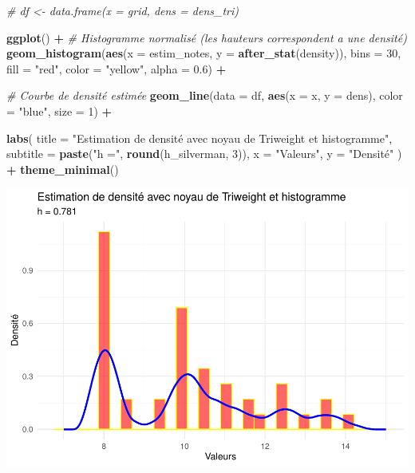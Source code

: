 \documentclass[
  12pt,
]{article}
\newenvironment{Shaded}{\begin{snugshade}}{\end{snugshade}}
\newcommand{\AttributeTok}[1]{\textcolor[rgb]{0.13,0.29,0.53}{#1}}
\newcommand{\CommentTok}[1]{\textcolor[rgb]{0.56,0.35,0.01}{\textit{#1}}}
\newcommand{\DecValTok}[1]{\textcolor[rgb]{0.00,0.00,0.81}{#1}}
\newcommand{\FloatTok}[1]{\textcolor[rgb]{0.00,0.00,0.81}{#1}}
\newcommand{\FunctionTok}[1]{\textcolor[rgb]{0.13,0.29,0.53}{\textbf{#1}}}
\newcommand{\NormalTok}[1]{#1}
\newcommand{\SpecialCharTok}[1]{\textcolor[rgb]{0.81,0.36,0.00}{\textbf{#1}}}
\newcommand{\StringTok}[1]{\textcolor[rgb]{0.31,0.60,0.02}{#1}}
\begin{document}
\begin{Shaded}
\begin{Highlighting}[]
\CommentTok{\# df \textless{}{-} data.frame(x = grid, dens = dens\_tri)}

\FunctionTok{ggplot}\NormalTok{() }\SpecialCharTok{+}
  \CommentTok{\# Histogramme normalisé (les hauteurs correspondent a une densité)}
  \FunctionTok{geom\_histogram}\NormalTok{(}\FunctionTok{aes}\NormalTok{(}\AttributeTok{x =}\NormalTok{ estim\_notes, }\AttributeTok{y =} \FunctionTok{after\_stat}\NormalTok{(density)),}
                 \AttributeTok{bins =} \DecValTok{30}\NormalTok{, }\AttributeTok{fill =} \StringTok{"red"}\NormalTok{, }\AttributeTok{color =} \StringTok{"yellow"}\NormalTok{, }\AttributeTok{alpha =} \FloatTok{0.6}\NormalTok{) }\SpecialCharTok{+}
  
  \CommentTok{\# Courbe de densité estimée}
  \FunctionTok{geom\_line}\NormalTok{(}\AttributeTok{data =}\NormalTok{ df, }\FunctionTok{aes}\NormalTok{(}\AttributeTok{x =}\NormalTok{ x, }\AttributeTok{y =}\NormalTok{ dens),}
            \AttributeTok{color =} \StringTok{"blue"}\NormalTok{, }\AttributeTok{size =} \DecValTok{1}\NormalTok{) }\SpecialCharTok{+}
  
  \FunctionTok{labs}\NormalTok{(}
    \AttributeTok{title =} \StringTok{"Estimation de densité avec noyau de Triweight et histogramme"}\NormalTok{,}
    \AttributeTok{subtitle =} \FunctionTok{paste}\NormalTok{(}\StringTok{"h ="}\NormalTok{, }\FunctionTok{round}\NormalTok{(h\_silverman, }\DecValTok{3}\NormalTok{)),}
    \AttributeTok{x =} \StringTok{"Valeurs"}\NormalTok{,}
    \AttributeTok{y =} \StringTok{"Densité"}
\NormalTok{  ) }\SpecialCharTok{+}
  \FunctionTok{theme\_minimal}\NormalTok{()}
\end{Highlighting}
\end{Shaded}

\includegraphics{Stat_non_para_files/figure-latex/unnamed-chunk-163-1.pdf}
\end{document}
